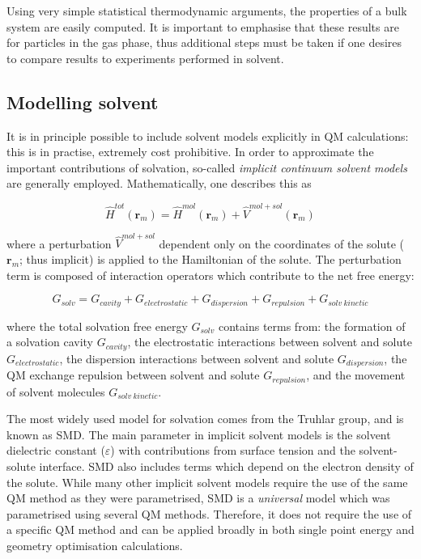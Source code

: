 Using very simple statistical thermodynamic arguments, the properties of a bulk
system are easily computed. It is important to emphasise that these results are
for particles in the gas phase, thus additional steps must be taken if one
desires to compare results to experiments performed in solvent.

\subsection{Modelling solvent}

It is in principle possible to include solvent models explicitly in QM
calculations: this is in practise, extremely cost prohibitive. In order to
approximate the important contributions of solvation, so-called \emph{implicit
  continuum solvent models} are generally
employed.\cite{Mennucci2007,Cramer2004} Mathematically, one describes this as

\begin{equation}
  \hat{H}^{tot}(\mathbf{r}_m) = \hat{H}^{mol}(\mathbf{r}_m) + \hat{V}^{mol+sol}(\mathbf{r}_m)
\end{equation}

\noindent where a perturbation $\hat{V}^{mol+sol}$ dependent only on the
coordinates of the solute ($\mathbf{r}_m$; thus implicit) is applied to the
Hamiltonian of the solute. The perturbation term is composed of interaction
operators which contribute to the net free energy:

\begin{equation}
G_{solv} = G_{cavity} + G_{electrostatic} + G_{dispersion} + G_{repulsion} +
G_{solv~kinetic}
\end{equation}

\noindent where the total solvation free energy $G_{solv}$ contains terms from:
the formation of a solvation cavity $G_{cavity}$, the electrostatic interactions
between solvent and solute $G_{electrostatic}$, the dispersion interactions
between solvent and solute $G_{dispersion}$, the QM exchange repulsion between
solvent and solute $G_{repulsion}$, and the movement of solvent molecules
$G_{solv~kinetic}$.

The most widely used model for solvation comes from the Truhlar group, and is
known as SMD.\cite{Marenich2009} The main parameter in implicit solvent models
is the solvent dielectric constant ($\varepsilon$) with contributions from
surface tension and the solvent-solute interface. SMD also includes terms which
depend on the electron density of the solute.  While many other implicit solvent
models require the use of the same QM method as they were
parametrised,\cite{Ho2010} SMD is a \emph{universal} model which was
parametrised using several QM methods. Therefore, it does not require the use of
a specific QM method and can be applied broadly in both single point energy and
geometry optimisation calculations.

